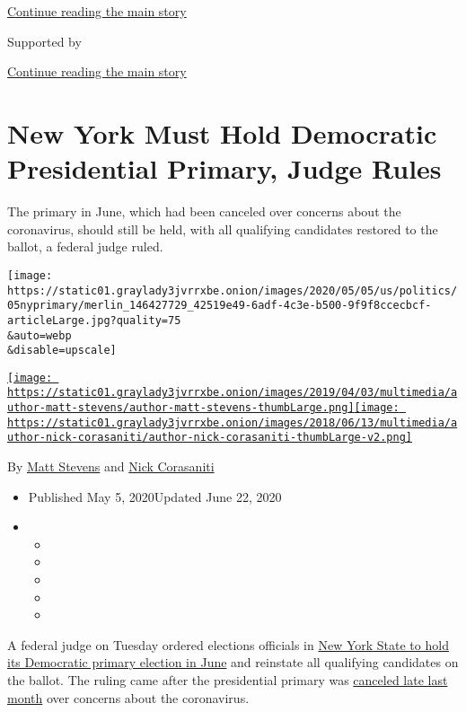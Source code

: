\protect\hyperlink{after-top}{Continue reading the main story}

Supported by

\protect\hyperlink{after-sponsor}{Continue reading the main story}

\hypertarget{new-york-must-hold-democratic-presidential-primary-judge-rules}{%
\section{New York Must Hold Democratic Presidential Primary, Judge
Rules}\label{new-york-must-hold-democratic-presidential-primary-judge-rules}}

The primary in June, which had been canceled over concerns about the
coronavirus, should still be held, with all qualifying candidates
restored to the ballot, a federal judge ruled.

\texttt{[image: https://static01.graylady3jvrrxbe.onion/images/2020/05/05/us/politics/05nyprimary/merlin\_146427729\_42519e49-6adf-4c3e-b500-9f9f8ccecbcf-articleLarge.jpg?quality=75\\\&auto=webp\\\&disable=upscale]}

\href{https://www.nytimes3xbfgragh.onion/by/matt-stevens}{\texttt{[image: https://static01.graylady3jvrrxbe.onion/images/2019/04/03/multimedia/author-matt-stevens/author-matt-stevens-thumbLarge.png]}}\href{https://www.nytimes3xbfgragh.onion/by/nick-corasaniti}{\texttt{[image: https://static01.graylady3jvrrxbe.onion/images/2018/06/13/multimedia/author-nick-corasaniti/author-nick-corasaniti-thumbLarge-v2.png]}}

By \href{https://www.nytimes3xbfgragh.onion/by/matt-stevens}{Matt
Stevens} and
\href{https://www.nytimes3xbfgragh.onion/by/nick-corasaniti}{Nick
Corasaniti}

\begin{itemize}
\item
  Published May 5, 2020Updated June 22, 2020
\item
  \begin{itemize}
  \item
  \item
  \item
  \item
  \item
  \end{itemize}
\end{itemize}

A federal judge on Tuesday ordered elections officials in
\href{https://www.nytimes3xbfgragh.onion/2020/06/22/nyregion/ny-primary-2020.html}{New
York State to hold its Democratic primary election in June} and
reinstate all qualifying candidates on the ballot. The ruling came after
the presidential primary was
\href{https://www.nytimes3xbfgragh.onion/2020/04/27/us/politics/democratic-primary-canceled-coronavirus.html}{canceled
late last month} over concerns about the coronavirus.

